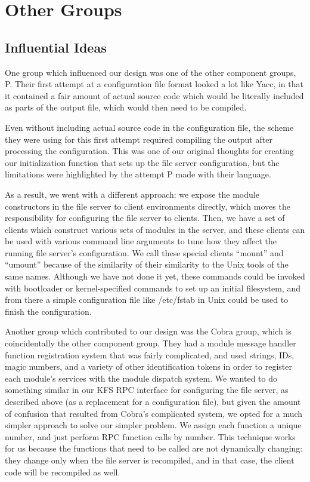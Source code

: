 \section{Other Groups}
\label{sec:groups}

\subsection{Influential Ideas}
\label{sec:groups:ideas}

One group which influenced our design was one of the other component groups, P.
Their first attempt at a configuration file format looked a lot like Yacc, in
that it contained a fair amount of actual source code which would be literally
included as parts of the output file, which would then need to be compiled.

Even without including actual source code in the configuration file, the scheme
they were using for this first attempt required compiling the output after
processing the configuration. This was one of our original thoughts for creating
our initialization function that sets up the file server configuration, but
the limitations were highlighted by the attempt P made with their language.

As a result, we went with a different approach: we expose the module
constructors in the file server to client environments directly, which moves the
responsibility for configuring the file server to clients. Then, we have a set
of clients which construct various sets of modules in the server, and these
clients can be used with various command line arguments to tune how they affect
the running file server's configuration. We call these special clients ``mount''
and ``umount'' because of the similarity of their similarity to the Unix tools
of the same names. Although we have not done it yet, these commands could be
invoked with bootloader or kernel-specified commands to set up an initial
filesystem, and from there a simple configuration file like /etc/fstab in Unix
could be used to finish the configuration.

Another group which contributed to our design was the Cobra group, which is
coincidentally the other component group. They had a module message handler
function registration system that was fairly complicated, and used strings,
IDs, magic numbers, and a variety of other identification tokens in order to
register each module's services with the module dispatch system. We wanted to do
something similar in our KFS RPC interface for configuring the file server, as
described above (as a replacement for a configuration file), but given the
amount of confusion that resulted from Cobra's complicated system, we opted for
a much simpler approach to solve our simpler problem. We assign each function a
unique number, and just perform RPC function calls by number. This technique
works for us because the functions that need to be called are not dynamically
changing: they change only when the file server is recompiled, and in that case,
the client code will be recompiled as well.

